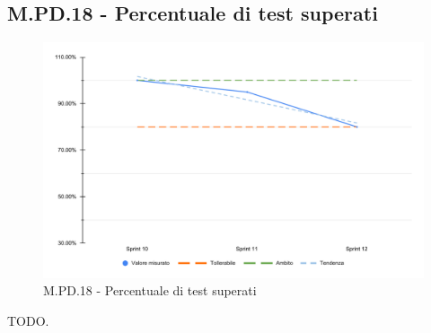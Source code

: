 \subsection{M.PD.18 - Percentuale di test superati}

\begin{figure}[H]
  \centering
  \includegraphics[width=\textwidth]{assets/test_superati.pdf}
  \caption{M.PD.18 - Percentuale di test superati}
\end{figure}

\par TODO.